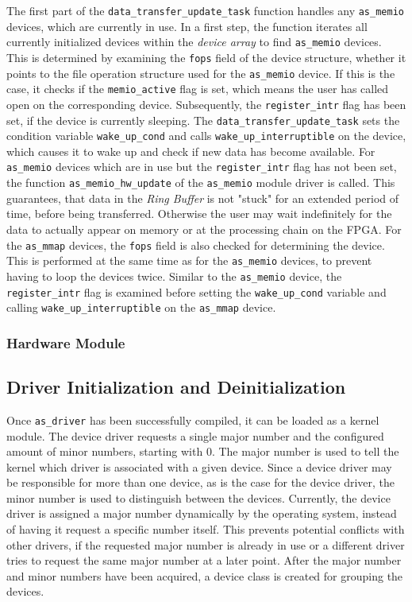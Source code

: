 The first part of the \texttt{data\_transfer\_update\_task} function handles any \texttt{as\_memio} devices, which are currently in use. 
In a first step, the function iterates all currently initialized devices within the \textit{device array} to find \texttt{as\_memio} devices. 
This is determined by examining the \texttt{fops} field of the device structure, whether it points to the file operation structure used for the \texttt{as\_memio} device. 
If this is the case, it checks if the \texttt{memio\_active} flag is set, which means the user has called open on the corresponding device. 
Subsequently, the \texttt{register\_intr} flag has been set, if the device is currently sleeping. 
The \texttt{data\_transfer\_update\_task} sets the condition variable \texttt{wake\_up\_cond} and calls \texttt{wake\_up\_interruptible} on the device, which causes it to wake up and check if new data has become available. 
For \texttt{as\_memio} devices which are in use but the \texttt{register\_intr} flag has not been set, the function \texttt{as\_memio\_hw\_update} of the \texttt{as\_memio} module driver is called. 
This guarantees, that data in the \textit{Ring Buffer} is not "stuck" for an extended period of time, before being transferred. 
Otherwise the user may wait indefinitely for the data to actually appear on memory or at the processing chain on the FPGA.
For the \texttt{as\_mmap} devices, the \texttt{fops} field is also checked for determining the device. 
This is performed at the same time as for the \texttt{as\_memio} devices, to prevent having to loop the devices twice. 
Similar to the \texttt{as\_memio} device, the \texttt{register\_intr} flag is examined before setting the \texttt{wake\_up\_cond} variable and calling \texttt{wake\_up\_interruptible} on the \texttt{as\_mmap} device.

\subsubsection{Hardware Module}



\subsection{Driver Initialization and Deinitialization}
Once \texttt{as\_driver} has been successfully compiled, it can be loaded as a kernel module.
The device driver requests a single major number and the configured amount of minor numbers, starting with 0.
The major number is used to tell the kernel which driver is associated with a given device.
Since a device driver may be responsible for more than one device, as is the case for the \asterics device driver, the minor number is used to distinguish between the devices.
Currently, the device driver is assigned a major number dynamically by the operating system, instead of having it request a specific number itself.
This prevents potential conflicts with other drivers, if the requested major number is already in use or a different driver tries to request the same major number at a later point.
After the major number and minor numbers have been acquired, a device class is created for grouping the devices.\newline

